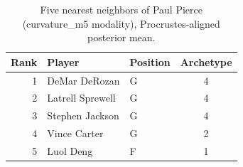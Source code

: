 \begin{table}[htbp]
  \centering\small
  \begin{tabular}{rllc}
    \toprule
    Rank & Player & Position & Archetype \\
    \midrule
    1 & DeMar DeRozan & G & 4 \\
    2 & Latrell Sprewell & G & 4 \\
    3 & Stephen Jackson & G & 4 \\
    4 & Vince Carter & G & 2 \\
    5 & Luol Deng & F & 1 \\
    \bottomrule
  \end{tabular}
  \caption{Five nearest neighbors of Paul Pierce (curvature_m5 modality), Procrustes-aligned posterior mean.}
  \label{tab:Paul_Pierce_neighbors_curvature_m5}
\end{table}

